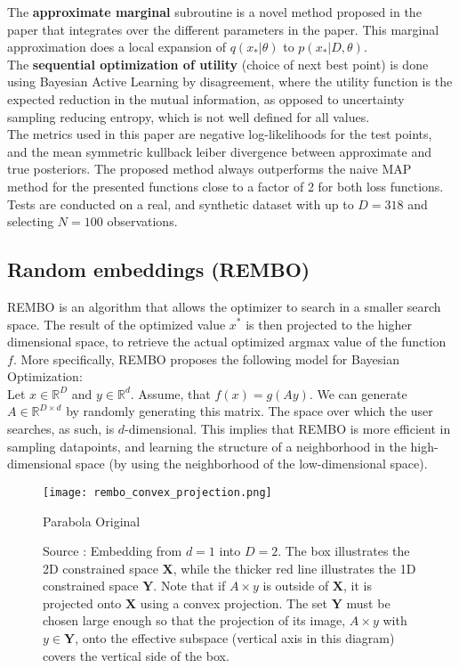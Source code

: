 The \textbf{approximate marginal} subroutine is a novel method proposed in the paper that integrates over the different parameters in the paper.
This marginal approximation does a local expansion of $q(x_* | \theta) $ to $p(x_* | D, \theta)$. \\

The \textbf{sequential optimization of utility} (choice of next best point) is done using Bayesian Active Learning by disagreement, where the utility function is the expected reduction in the mutual information, as opposed to uncertainty sampling reducing entropy, which  is not well defined for all values. \\

The metrics used in this paper are negative log-likelihoods for the test points, and the mean symmetric kullback leiber divergence between approximate and true posteriors.
The proposed method always outperforms the naive MAP method for the presented functions close to a factor of 2 for both loss functions.
Tests are conducted on a real, and synthetic dataset with up to $D = 318$ and selecting $N = 100$ observations. 

\subsection{Random embeddings (REMBO)}
REMBO is an algorithm that allows the optimizer to search in a smaller search space.
The result of the optimized value $x^*$ is then projected to the higher dimensional space, to retrieve the actual optimized argmax value of the function $f$. 
More specifically, REMBO proposes the following model for Bayesian Optimization: \\

\citep{Wang2013} Let $x \in \mathbb{R}^D$ and $y \in \mathbb{R}^d$. Assume, that $f(x) = g(Ay)$. We can generate $A \in \mathbb{R}^{D \times d}$ by randomly generating this matrix.
The space over which the user searches, as such, is $d$-dimensional.
This implies that REMBO is more efficient in sampling datapoints, and learning the structure of a neighborhood in the high-dimensional space (by using the neighborhood of the low-dimensional space). \\

\begin{figure}[H]
    \centering
        \texttt{[image: rembo\_convex\_projection.png]}
        \caption{Parabola Original}
        \label{fig:gull}
    \caption{
    Source \citep{Wang2013}: Embedding from $d = 1$ into $D=2$.
    The box illustrates the 2D constrained space $\mathbf{X}$, while the thicker red line illustrates the 1D constrained space $\mathbf{Y}$.
    Note that if $A \times y$ is outside of $\mathbf{X}$, it is projected onto $\mathbf{X}$ using a convex projection.
    The set $\mathbf{Y}$ must be chosen large enough so that the projection of its image, $A \times y $ with $y \in \mathbf{Y}$, onto the effective subspace (vertical axis in this diagram) covers the vertical side of the box.
    }\label{fig:animals}
\end{figure}

